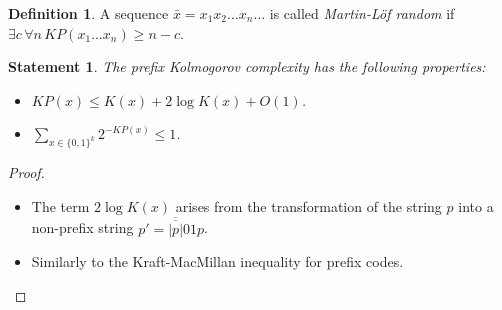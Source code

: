 \documentclass[12pt,sans]{article}
\theoremstyle{definition}
\newtheorem{definition}{Definition}[section]
\theoremstyle{plain}
\newtheorem{statement}{Statement}[section]
\theoremstyle{remark}
\begin{document}
\begin{definition}
    A sequence $\bar{x} = x_1 x_2 \dotso x_n \dotso$ is called \emph{Martin-Löf random} if $\exists c \, \forall n \, KP(x_1 \dotso x_n) \ge n - c$.
\end{definition}

\begin{statement}
    The prefix Kolmogorov complexity has the following properties:
    \begin{itemize}
        \item $KP(x) \le K(x) + 2\log K(x) + O(1)$.
        \item $\sum_{x \in \{0,1\}^k} 2^{-KP(x)} \le 1$.
    \end{itemize}
\end{statement}
\begin{proof}\mbox{}
    \begin{itemize}
        \item The term $2\log K(x)$ arises from the transformation of the string $p$ into a non-prefix string $p' = \overline{\overline{|p|}}01p$.
        \item Similarly to the Kraft-MacMillan inequality for prefix codes.
    \end{itemize}
\end{proof}
\end{document}
